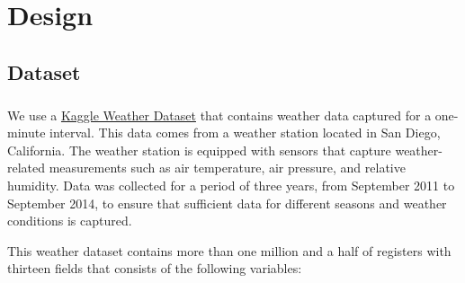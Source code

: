 \documentclass{book}
\begin{document}
\chapter{Design}\label{chap:design}
    \section{Dataset}
    \paragraph{}

    We use a \href{https://www.kaggle.com/julianjose/minute-weather}{Kaggle Weather Dataset} that contains weather data captured for a one-minute interval. This data comes from a weather station located in San Diego, California. The weather station is equipped with sensors that capture weather-related measurements such as air temperature, air pressure, and relative humidity. Data was collected for a period of three years, from September 2011 to September 2014, to ensure that sufficient data for different seasons and weather conditions is captured. 

    This weather dataset contains more than one million and a half of registers with thirteen fields that consists of the following variables: 
\end{document}
